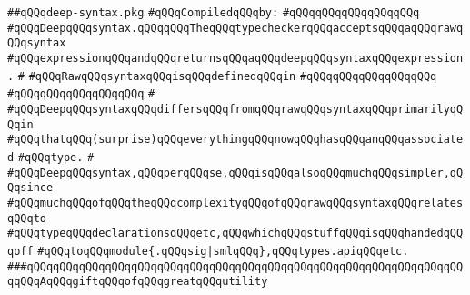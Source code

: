 \label{src/lib/compiler/front/typer-stuff/deep-syntax/deep-syntax.pkg}
\verb|##qQQqdeep-syntax.pkg|\newline
\newline
\verb|#qQQqCompiledqQQqby:|\newline
\verb|#qQQqqQQqqQQqqQQqqQQq|\newline
\newline
\newline
\newline
\verb|#qQQqDeepqQQqsyntax.qQQqqQQqTheqQQqtypecheckerqQQqacceptsqQQqaqQQqrawqQQqsyntax|\newline
\verb|#qQQqexpressionqQQqandqQQqreturnsqQQqaqQQqdeepqQQqsyntaxqQQqexpression.|\newline
\verb|#|\newline
\verb|#qQQqRawqQQqsyntaxqQQqisqQQqdefinedqQQqin|\newline
\verb|#qQQqqQQqqQQqqQQqqQQq|\newline
\verb|#qQQqqQQqqQQqqQQqqQQq|\newline
\verb|#|\newline
\verb|#qQQqDeepqQQqsyntaxqQQqdiffersqQQqfromqQQqrawqQQqsyntaxqQQqprimarilyqQQqin|\newline
\verb|#qQQqthatqQQq(surprise)qQQqeverythingqQQqnowqQQqhasqQQqanqQQqassociated|\newline
\verb|#qQQqtype.|\newline
\verb|#|\newline
\verb|#qQQqDeepqQQqsyntax,qQQqperqQQqse,qQQqisqQQqalsoqQQqmuchqQQqsimpler,qQQqsince|\newline
\verb|#qQQqmuchqQQqofqQQqtheqQQqcomplexityqQQqofqQQqrawqQQqsyntaxqQQqrelatesqQQqto|\newline
\verb|#qQQqtypeqQQqdeclarationsqQQqetc,qQQqwhichqQQqstuffqQQqisqQQqhandedqQQqoff|\newline
\verb|#qQQqtoqQQqmodule{.qQQqsig|\verb#|smlqQQq},qQQqtypes.apiqQQqetc.#\newline
\newline
\newline
\verb|###qQQqqQQqqQQqqQQqqQQqqQQqqQQqqQQqqQQqqQQqqQQqqQQqqQQqqQQqqQQqqQQqqQQqqQQqAqQQqgiftqQQqofqQQqgreatqQQqutility|\newline
